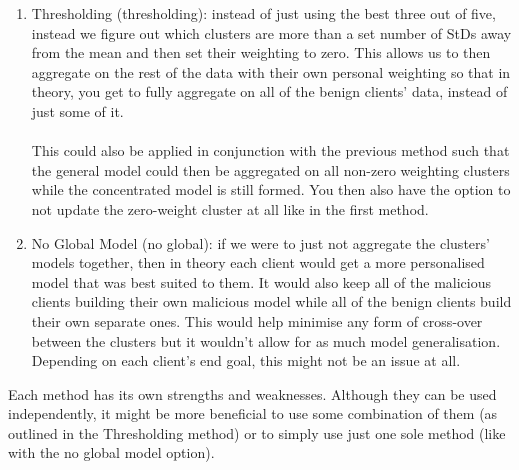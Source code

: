 \begin{enumerate}
    \item Thresholding (thresholding): instead of just using the best three out of five, instead we figure out which clusters are more than a set number of StDs away from the mean and then set their weighting to zero.
    This allows us to then aggregate on the rest of the data with their own personal weighting so that in theory, you get to fully aggregate on all of the benign clients' data, instead of just some of it.
    \\ \\
    This could also be applied in conjunction with the previous method such that the general model could then be aggregated on all non-zero weighting clusters while the concentrated model is still formed.
    You then also have the option to not update the zero-weight cluster at all like in the first method.
    
    \item No Global Model (no global): if we were to just not aggregate the clusters' models together, then in theory each client would get a more personalised model that was best suited to them.
    It would also keep all of the malicious clients building their own malicious model while all of the benign clients build their own separate ones.
    This would help minimise any form of cross-over between the clusters but it wouldn't allow for as much model generalisation.
    Depending on each client's end goal, this might not be an issue at all.
\end{enumerate}

Each method has its own strengths and weaknesses.
Although they can be used independently, it might be more beneficial to use some combination of them (as outlined in the Thresholding method) or to simply use just one sole method (like with the no global model option).


